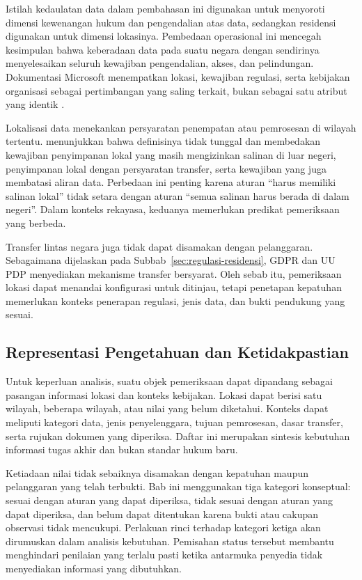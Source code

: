 Istilah kedaulatan data dalam pembahasan ini digunakan untuk menyoroti dimensi kewenangan hukum dan pengendalian atas data, sedangkan residensi digunakan untuk dimensi lokasinya. Pembedaan operasional ini mencegah kesimpulan bahwa keberadaan data pada suatu negara dengan sendirinya menyelesaikan seluruh kewajiban pengendalian, akses, dan pelindungan. Dokumentasi Microsoft menempatkan lokasi, kewajiban regulasi, serta kebijakan organisasi sebagai pertimbangan yang saling terkait, bukan sebagai satu atribut yang identik \autocite{msresidency2026}.

Lokalisasi data menekankan persyaratan penempatan atau pemrosesan di wilayah tertentu. \textcite{oecd2023} menunjukkan bahwa definisinya tidak tunggal dan membedakan kewajiban penyimpanan lokal yang masih mengizinkan salinan di luar negeri, penyimpanan lokal dengan persyaratan transfer, serta kewajiban yang juga membatasi aliran data. Perbedaan ini penting karena aturan ``harus memiliki salinan lokal'' tidak setara dengan aturan ``semua salinan harus berada di dalam negeri''. Dalam konteks rekayasa, keduanya memerlukan predikat pemeriksaan yang berbeda.

Transfer lintas negara juga tidak dapat disamakan dengan pelanggaran. Sebagaimana dijelaskan pada Subbab~\ref{sec:regulasi-residensi}, GDPR dan UU PDP menyediakan mekanisme transfer bersyarat. Oleh sebab itu, pemeriksaan lokasi dapat menandai konfigurasi untuk ditinjau, tetapi penetapan kepatuhan memerlukan konteks penerapan regulasi, jenis data, dan bukti pendukung yang sesuai.

\subsection{Representasi Pengetahuan dan Ketidakpastian}
Untuk keperluan analisis, suatu objek pemeriksaan dapat dipandang sebagai pasangan informasi lokasi dan konteks kebijakan. Lokasi dapat berisi satu wilayah, beberapa wilayah, atau nilai yang belum diketahui. Konteks dapat meliputi kategori data, jenis penyelenggara, tujuan pemrosesan, dasar transfer, serta rujukan dokumen yang diperiksa. Daftar ini merupakan sintesis kebutuhan informasi tugas akhir dan bukan standar hukum baru.

Ketiadaan nilai tidak sebaiknya disamakan dengan kepatuhan maupun pelanggaran yang telah terbukti. Bab ini menggunakan tiga kategori konseptual: sesuai dengan aturan yang dapat diperiksa, tidak sesuai dengan aturan yang dapat diperiksa, dan belum dapat ditentukan karena bukti atau cakupan observasi tidak mencukupi. Perlakuan rinci terhadap kategori ketiga akan dirumuskan dalam analisis kebutuhan. Pemisahan status tersebut membantu menghindari penilaian yang terlalu pasti ketika antarmuka penyedia tidak menyediakan informasi yang dibutuhkan.

